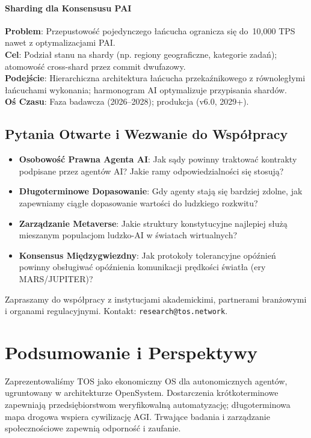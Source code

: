 \documentclass[11pt]{article}
\begin{document}
\paragraph{Sharding dla Konsensusu PAI}
\textbf{Problem}: Przepustowość pojedynczego łańcucha ogranicza się do~10,000 TPS nawet z optymalizacjami PAI.\\
\textbf{Cel}: Podział stanu na shardy (np. regiony geograficzne, kategorie zadań); atomowość cross-shard przez commit dwufazowy.\\
\textbf{Podejście}: Hierarchiczna architektura łańcucha przekaźnikowego z równoległymi łańcuchami wykonania; harmonogram AI optymalizuje przypisania shardów.\\
\textbf{Oś Czasu}: Faza badawcza (2026--2028); produkcja (v6.0, 2029+).

\subsection{Pytania Otwarte i Wezwanie do Współpracy}

\begin{itemize}[noitemsep]
  \item \textbf{Osobowość Prawna Agenta AI}: Jak sądy powinny traktować kontrakty podpisane przez agentów AI? Jakie ramy odpowiedzialności się stosują?
  \item \textbf{Długoterminowe Dopasowanie}: Gdy agenty stają się bardziej zdolne, jak zapewniamy ciągłe dopasowanie wartości do ludzkiego rozkwitu?
  \item \textbf{Zarządzanie Metaverse}: Jakie struktury konstytucyjne najlepiej służą mieszanym populacjom ludzko-AI w światach wirtualnych?
  \item \textbf{Konsensus Międzygwiezdny}: Jak protokoły tolerancyjne opóźnień powinny obsługiwać opóźnienia komunikacji prędkości światła (ery MARS/JUPITER)?
\end{itemize}

Zapraszamy do współpracy z instytucjami akademickimi, partnerami branżowymi i organami regulacyjnymi. Kontakt: \texttt{research@tos.network}.

\section{Podsumowanie i Perspektywy}
Zaprezentowaliśmy TOS jako ekonomiczny OS dla autonomicznych agentów, ugruntowany w architekturze OpenSystem. Dostarczenia krótkoterminowe zapewniają przedsiębiorstwom weryfikowalną automatyzację; długoterminowa mapa drogowa wspiera cywilizację AGI. Trwające badania i zarządzanie społecznościowe zapewnią odporność i zaufanie.
\end{document}
